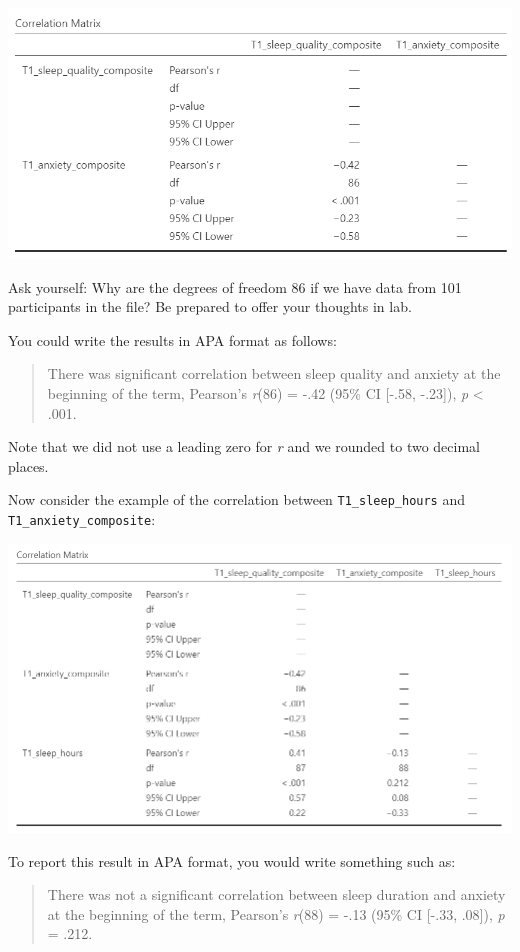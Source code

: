 \documentclass[
]{book}
\begin{document}
\includegraphics{img/CorrelationMatrix3VersionB.png}

Ask yourself: Why are the degrees of freedom 86 if we have data from 101 participants in the file? Be prepared to offer your thoughts in lab.

You could write the results in APA format as follows:

\begin{quote}
There was significant correlation between sleep quality and anxiety at the beginning of the term, Pearson's \emph{r}(86) = -.42 (95\% CI {[}-.58, -.23{]}), \emph{p} \textless{} .001.
\end{quote}

Note that we did not use a leading zero for \emph{r} and we rounded to two decimal places.

Now consider the example of the correlation between \texttt{T1\_sleep\_hours} and \texttt{T1\_anxiety\_composite}:

\includegraphics{img/CorrelationMatrix2VersionC.png}

To report this result in APA format, you would write something such as:

\begin{quote}
There was not a significant correlation between sleep duration and anxiety at the beginning of the term, Pearson's \emph{r}(88) = -.13 (95\% CI {[}-.33, .08{]}), \emph{p} = .212.
\end{quote}
\end{document}
